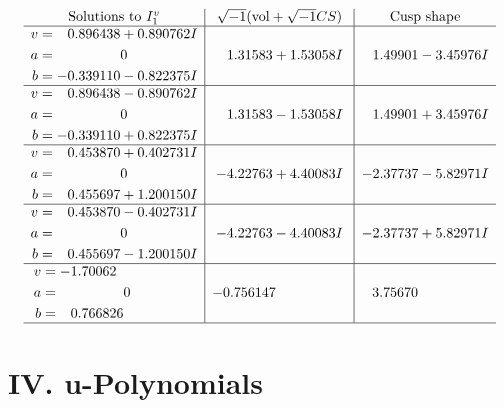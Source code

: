 \documentclass[1p]{elsarticle_modified}
\theoremstyle{definition}
\newcommand{\I}{\sqrt{-1}}
\begin{document}
$$\begin{array}{c|c|c}  
\text{Solutions to }I^v_{1}& \I (\text{vol} + \sqrt{-1}CS) & \text{Cusp shape}\\
 \hline 
\begin{aligned}
v &= \phantom{-}0.896438 + 0.890762 I \\
a &= \phantom{-0.000000 } 0 \\
b &= -0.339110 - 0.822375 I\end{aligned}
 & \phantom{-}1.31583 + 1.53058 I & \phantom{-}1.49901 - 3.45976 I \\ \hline\begin{aligned}
v &= \phantom{-}0.896438 - 0.890762 I \\
a &= \phantom{-0.000000 } 0 \\
b &= -0.339110 + 0.822375 I\end{aligned}
 & \phantom{-}1.31583 - 1.53058 I & \phantom{-}1.49901 + 3.45976 I \\ \hline\begin{aligned}
v &= \phantom{-}0.453870 + 0.402731 I \\
a &= \phantom{-0.000000 } 0 \\
b &= \phantom{-}0.455697 + 1.200150 I\end{aligned}
 & -4.22763 + 4.40083 I & -2.37737 - 5.82971 I \\ \hline\begin{aligned}
v &= \phantom{-}0.453870 - 0.402731 I \\
a &= \phantom{-0.000000 } 0 \\
b &= \phantom{-}0.455697 - 1.200150 I\end{aligned}
 & -4.22763 - 4.40083 I & -2.37737 + 5.82971 I \\ \hline\begin{aligned}
v &= -1.70062\phantom{ +0.000000I} \\
a &= \phantom{-0.000000 } 0 \\
b &= \phantom{-}0.766826\phantom{ +0.000000I}\end{aligned}
 & -0.756147\phantom{ +0.000000I} & \phantom{-}3.75670\phantom{ +0.000000I}\\
 \hline 
 \end{array}$$\newpage
\newpage\renewcommand{\arraystretch}{1}
\centering \section*{ IV. u-Polynomials}
\end{document}
